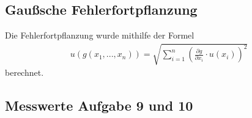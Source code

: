 \documentclass[11pt, a4paper]{article}
\begin{document}
    \subsection{Gaußsche Fehlerfortpflanzung}
    Die Fehlerfortpflanzung wurde mithilfe der Formel
    \begin{align}
        u\left(g \left(x_1, ..., x_n\right)\right) = \sqrt{\sum_{i=1}^n \left( \frac{\partial g }{\partial x_i} \cdot u\left(x_i\right) \right)^2} \label{gauss}
    \end{align}
    berechnet.
    \subsection{Messwerte Aufgabe 9 und 10}
    

    
    
\end{document}
